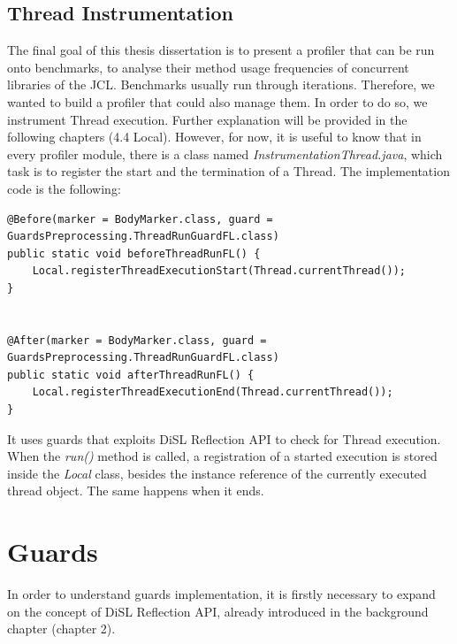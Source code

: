 \documentclass[]{usiinfthesis}
\begin{document}
\subsection{Thread Instrumentation}
The final goal of this thesis dissertation is to present a profiler that can be run onto benchmarks, to analyse their method usage frequencies of concurrent libraries of the JCL. Benchmarks usually run through iterations. Therefore, we wanted to build a profiler that could also manage them. In order to do so, we instrument Thread execution. Further explanation will be provided in the following chapters (4.4 Local). However, for now, it is useful to know that in every profiler module, there is a class named \textit{InstrumentationThread.java}, which task is to register the start and the termination of a Thread. The implementation code is the  following:

\vspace*{0.5cm}
\begin{verbatim}
@Before(marker = BodyMarker.class, guard = GuardsPreprocessing.ThreadRunGuardFL.class)
public static void beforeThreadRunFL() {
    Local.registerThreadExecutionStart(Thread.currentThread());
}


@After(marker = BodyMarker.class, guard = GuardsPreprocessing.ThreadRunGuardFL.class)
public static void afterThreadRunFL() {
    Local.registerThreadExecutionEnd(Thread.currentThread());
}
\end{verbatim}
\vspace*{0.5cm}

\noindent
It uses guards that exploits DiSL Reflection API to check for Thread execution. When the \textit{run()} method is called, a registration of a started execution is stored inside the \textit{Local} class, besides the instance reference of the currently executed thread object. The same happens when it ends.

\section{Guards}
In order to understand guards implementation, it is firstly necessary to expand on the concept of DiSL Reflection API, already introduced in the background chapter (chapter 2).
\end{document}
